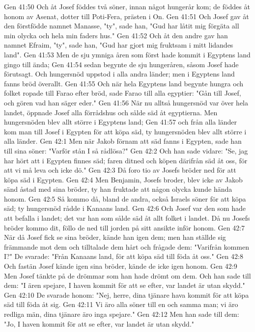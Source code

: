 Gen 41:50  Och åt Josef föddes två söner, innan något hungerår kom; de föddes åt honom av Asenat, dotter till Poti-Fera, prästen i On.
Gen 41:51  Och Josef gav åt den förstfödde namnet Manasse, "ty", sade han, "Gud har låtit mig förgäta all min olycka och hela min faders hus."
Gen 41:52  Och åt den andre gav han namnet Efraim, "ty", sade han, "Gud har gjort mig fruktsam i mitt lidandes land".
Gen 41:53  Men de sju ymniga åren som först hade kommit i Egyptens land gingo till ända;
Gen 41:54  sedan begynte de sju hungeråren, såsom Josef hade förutsagt. Och hungersnöd uppstod i alla andra länder; men i Egyptens land fanns bröd överallt.
Gen 41:55  Och när hela Egyptens land begynte hungra och folket ropade till Farao efter bröd, sade Farao till alla egyptier: "Gån till Josef, och gören vad han säger eder."
Gen 41:56  När nu alltså hungersnöd var över hela landet, öppnade Josef alla förrådshus och sålde säd åt egyptierna. Men hungersnöden blev allt större i Egyptens land;
Gen 41:57  och från alla länder kom man till Josef i Egypten för att köpa säd, ty hungersnöden blev allt större i alla länder.
Gen 42:1  Men när Jakob förnam att säd fanns i Egypten, sade han till sina söner: "Varför stån I så rådlösa?"
Gen 42:2  Och han sade vidare: "Se, jag har hört att i Egypten finnes säd; faren ditned och köpen därifrån säd åt oss, för att vi må leva och icke dö."
Gen 42:3  Då foro tio av Josefs bröder ned för att köpa säd i Egypten.
Gen 42:4  Men Benjamin, Josefs broder, blev icke av Jakob sänd åstad med sina bröder, ty han fruktade att någon olycka kunde hända honom.
Gen 42:5  Så kommo då, bland de andra, också Israels söner för att köpa säd; ty hungersnöd rådde i Kanaans land.
Gen 42:6  Och Josef var den som hade att befalla i landet; det var han som sålde säd åt allt folket i landet. Då nu Josefs bröder kommo dit, föllo de ned till jorden på sitt ansikte inför honom.
Gen 42:7  När då Josef fick se sina bröder, kände han igen dem; men han ställde sig främmande mot dem och tilltalade dem hårt och frågade dem: "Varifrån kommen I?" De svarade: "Från Kanaans land, för att köpa säd till föda åt oss."
Gen 42:8  Och fastän Josef kände igen sina bröder, kände de icke igen honom.
Gen 42:9  Men Josef tänkte på de drömmar som han hade drömt om dem. Och han sade till dem: "I ären spejare, I haven kommit för att se efter, var landet är utan skydd."
Gen 42:10  De svarade honom: "Nej, herre, dina tjänare hava kommit för att köpa säd till föda åt sig.
Gen 42:11  Vi äro alla söner till en och samma man; vi äro redliga män, dina tjänare äro inga spejare."
Gen 42:12  Men han sade till dem: "Jo, I haven kommit för att se efter, var landet är utan skydd."
